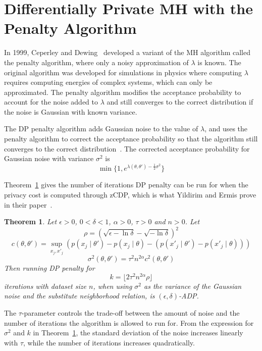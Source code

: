 \documentclass[english,twoside,openright]{HYgraduMLDS}
\newtheorem{theorem}[lemma]{Theorem}
\begin{document}
\section{Differentially Private MH with the Penalty Algorithm}\label{dp_penalty_section}

In 1999, Ceperley and Dewing~\cite{CeD99} developed a variant of 
the MH algorithm called the penalty
algorithm, where only a noisy approximation of \(\lambda\) is known. The
original algorithm was
developed for simulations in physics where computing \(\lambda\)
requires computing energies of complex systems, which can only be approximated.
The penalty algorithm modifies the acceptance probability to account for the 
noise added to \(\lambda\) and still converges to the correct distribution if 
the noise is Gaussian with known variance.

The DP penalty algorithm adds Gaussian noise to the value of \(\lambda\), and 
uses the penalty algorithm to correct the acceptance probability so that 
the algorithm still converges to the correct distribution~\cite{YildirimE19}.
The corrected acceptance probability for Gaussian noise with variance 
\(\sigma^2\) is 
\[
    \min\{1, e^{\lambda(\theta, \theta') - \frac{1}{2}\sigma^2}\}
\]

Theorem~\ref{DP_penalty_theorem_zcdp} gives the number of iterations DP penalty 
can be run for when the privacy cost is computed through zCDP, which is 
what Yildirim and Ermis prove in their paper~\cite{YildirimE19}.

\begin{theorem}\label{DP_penalty_theorem_zcdp}
  Let \(\epsilon > 0\), \(0 < \delta < 1\), \(\alpha > 0\), \(\tau > 0\) and
  \(n > 0\).
    Let
    \[
        \rho = (\sqrt{\epsilon - \ln \delta} - \sqrt{-\ln \delta})^2
    \]
    \[
        c(\theta, \theta') = \sup_{x_j, x'_j} (p(x_j\mid \theta') - p(x_j\mid \theta) 
        - (p(x'_j\mid \theta') - p(x'_j\mid \theta)))
    \]
    \[
        \sigma^2(\theta, \theta') = \tau^2 n^{2\alpha}c^2(\theta, \theta')
    \]
    Then running DP penalty for
    \[
        k = \lfloor 2\tau^2 n^{2\alpha} \rho\rfloor
    \]
    iterations with dataset size \(n\), when using \(\sigma^2\) as the
    variance of the Gaussian noise
    and the substitute neighborhood relation, is \((\epsilon, \delta)\)-ADP.
\end{theorem}

The \(\tau\)-parameter controls the trade-off between the amount of noise
and the number of iterations the algorithm is allowed to run for. From the
expression for \(\sigma^{2}\) and \(k\) in Theorem~\ref{DP_penalty_theorem_zcdp},
the standard deviation of the noise increases linearly with \(\tau\), while
the number of iterations increases quadratically.
\end{document}
